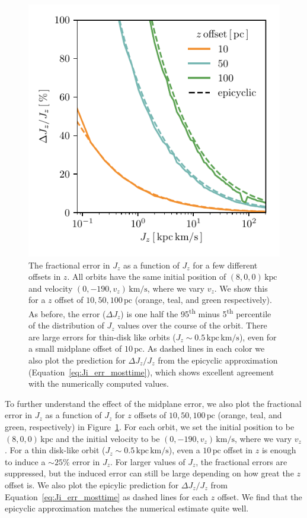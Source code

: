 \documentclass[twocolumn]{aastex62}
\newcommand{\pc}{\text{pc}}
\newcommand{\kpc}{\text{kpc}}
\newcommand{\kms}{\text{km}/\text{s}}
\newcommand{\actunit}{\text{kpc}\,\kms}
\newcommand{\uth}{\textsuperscript{th}}
\begin{document}
\begin{figure}
\begin{center}
\includegraphics[width=\columnwidth]{fig/schmactions_many_orbits_Jz_fun.pdf}
\end{center}
\caption{The fractional error in $J_z$ as a function of $J_z$ for a few
different offsets in $z$. All orbits have the same initial position of $(8, 0,
0)\,\kpc$ and velocity $(0, -190, v_z)\,\kms$, where we vary $v_z$. We show
this for a $z$ offset of $10, 50, 100\,\pc$ (orange, teal, and green
respectively). As before, the error ($\Delta J_z$) is one half the 95\uth{}
minus 5\uth{} percentile of the distribution of $J_z$ values over the
course of the orbit. There are large errors for thin-disk like orbits ($J_z
\sim 0.5\,\actunit$), even for a small midplane offset of $10\,\pc$. As dashed
lines in each color we also plot the prediction for $\Delta J_z/J_z$ from the
epicyclic approximation (Equation~\eqref{eq:Ji_err_mosttime}), which shows
excellent agreement with the numerically computed values.}
\label{fig:dJz_fun_Jz}
\end{figure}

To further understand the effect of the midplane error, we also plot the
fractional error in $J_z$ as a function of $J_z$ for $z$ offsets of $10, 50,
100\,\pc$ (orange, teal, and green, respectively) in
Figure~\ref{fig:dJz_fun_Jz}. For each orbit, we set the initial position to be
$(8,0,0)\,\kpc$ and the initial velocity to be $(0, -190, v_z)\,\kms$, where
we vary $v_z$. For a thin disk-like orbit ($J_z\sim0.5\,\actunit$), even a
$10\,\pc$ offset in $z$ is enough to induce a $\sim25\%$ error in $J_z$. For
larger values of $J_z$, the fractional errors are suppressed, but the induced
error can still be large depending on how great the $z$ offset is. We also
plot the epicylic prediction for $\Delta J_z / J_z$ from
Equation~\eqref{eq:Ji_err_mosttime} as dashed lines for each $z$ offset. We
find that the epicyclic approximation matches the numerical estimate quite
well.
\end{document}

